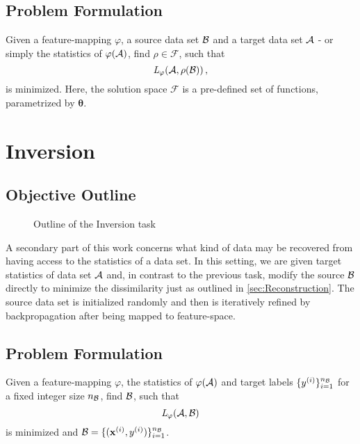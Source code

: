 \subsection{Problem Formulation}
Given a feature-mapping $\varphi$, a source data set $\mathcal B$ and a target data set $\mathcal A$ - or simply the statistics of $\varphi(\mathcal A)$,  find $\rho \in \mathcal{F}$, such that
\[
     \textit{L} _\varphi (\mathcal A, \rho(\mathcal B)) \,,
\]
is minimized.
Here, the solution space $\mathcal F$ is a pre-defined set of functions, 
parametrized by $\boldsymbol \theta$.






\section{Inversion}
\label{sec:Inversion}

\subsection{Objective Outline}

\begin{figure}[h]
    \centering
    
    \caption{Outline of the Inversion task}
    \label{fig:inversion_outline}
    \centering
\end{figure}

A secondary part of this work concerns what kind of data 
may be recovered from having access to the statistics of a data set.
In this setting, we are given target statistics of data set $\mathcal A$
and, in contrast to the previous task, modify the source $\mathcal B$ directly to 
minimize the dissimilarity just as outlined in \cref{sec:Reconstruction}.
The source data set is initialized randomly and then is 
iteratively refined by backpropagation after being mapped to feature-space.



\subsection{Problem Formulation}
Given a feature-mapping $\varphi$, the statistics of $\varphi(\mathcal A)$
and target labels $\{y^{(i)}\}_{i=1}^{n_{\mathcal B}}$ for a fixed integer size $n_{\mathcal B}$,
find $\mathcal B$, such that
\[
     \textit{L} _\varphi (\mathcal A, \mathcal B)
\]
is minimized and $\mathcal B = \{(\mathbf x^{(i)}, y^{(i)})\}_{i=1}^{n_{\mathcal B}}$.


